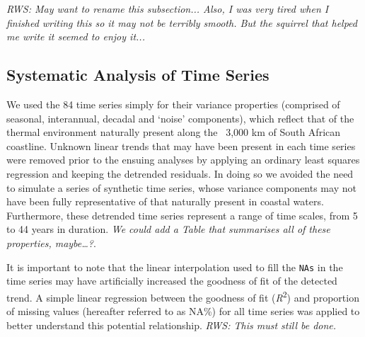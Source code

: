 \documentclass{ametsoc}
\begin{document}
\emph{RWS: May want to rename this subsection... Also, I was very tired when I finished writing this so it may not be terribly smooth. But the squirrel that helped me write it seemed to enjoy it...}

\subsection{Systematic Analysis of Time Series}
We used the 84 time series simply for their variance properties (comprised of seasonal, interannual, decadal and ‘noise’ components), which reflect that of the thermal environment naturally present along the ~3,000 km of South African coastline. Unknown linear trends that may have been present in each time series were removed prior to the ensuing analyses by applying an ordinary least squares regression and keeping the detrended residuals. In doing so we avoided the need to simulate a series of synthetic time series, whose variance components may not have been fully representative of that naturally present in coastal waters. Furthermore, these detrended time series represent a range of time scales, from 5 to 44 years in duration. \emph{We could add a Table that summarises all of these properties, maybe…?}.

It is important to note that the linear interpolation used to fill the \texttt{NAs} in the time series may have artificially increased the goodness of fit of the detected trend. A simple linear regression between the goodness of fit (\emph{R}\textsuperscript{2}) and proportion of missing values (hereafter referred to as NA\%) for all time series was applied to better understand this potential relationship. \emph{RWS: This must still be done.}
\end{document}
